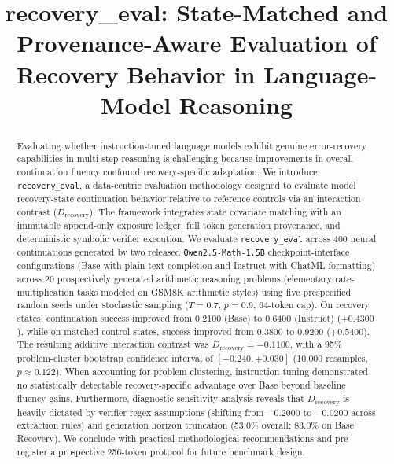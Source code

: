 \documentclass[conference]{IEEEtran}
\begin{document}
\title{recovery\_eval: State-Matched and Provenance-Aware Evaluation of Recovery Behavior in Language-Model Reasoning}

\author{
}

\maketitle

\begin{abstract}
Evaluating whether instruction-tuned language models exhibit genuine error-recovery capabilities in multi-step reasoning is challenging because improvements in overall continuation fluency confound recovery-specific adaptation. We introduce \texttt{recovery\_eval}, a data-centric evaluation methodology designed to evaluate model recovery-state continuation behavior relative to reference controls via an interaction contrast ($D_{\text{recovery}}$). The framework integrates state covariate matching with an immutable append-only exposure ledger, full token generation provenance, and deterministic symbolic verifier execution. We evaluate \texttt{recovery\_eval} across 400 neural continuations generated by two released \texttt{Qwen2.5-Math-1.5B} checkpoint-interface configurations (Base with plain-text completion and Instruct with ChatML formatting) across 20 prospectively generated arithmetic reasoning problems (elementary rate-multiplication tasks modeled on GSM8K arithmetic styles) using five prespecified random seeds under stochastic sampling ($T=0.7$, $p=0.9$, 64-token cap). On recovery states, continuation success improved from 0.2100 (Base) to 0.6400 (Instruct) ($+0.4300$), while on matched control states, success improved from 0.3800 to 0.9200 ($+0.5400$). The resulting additive interaction contrast was $D_{\text{recovery}} = -0.1100$, with a 95\% problem-cluster bootstrap confidence interval of $[-0.240, +0.030]$ (10,000 resamples, $p \approx 0.122$). When accounting for problem clustering, instruction tuning demonstrated no statistically detectable recovery-specific advantage over Base beyond baseline fluency gains. Furthermore, diagnostic sensitivity analysis reveals that $D_{\text{recovery}}$ is heavily dictated by verifier regex assumptions (shifting from $-0.2000$ to $-0.0200$ across extraction rules) and generation horizon truncation (53.0\% overall; 83.0\% on Base Recovery). We conclude with practical methodological recommendations and pre-register a prospective 256-token protocol for future benchmark design.
\end{abstract}
\end{document}
